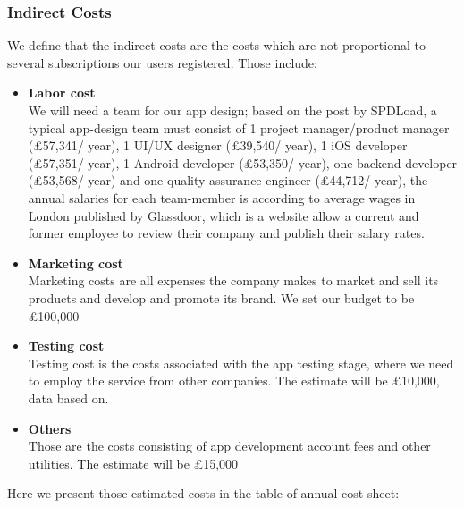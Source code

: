 \subsubsection{Indirect Costs}
We define that the indirect costs are the costs which are not proportional to several subscriptions our users registered. Those include:
\begin{itemize}
\item \textbf{Labor cost}
\\We will need a team for our app design; based on the post by SPDLoad, a typical app-design team must consist of 1 project manager/product manager (£57,341/ year), 1 UI/UX designer (£39,540/ year), 1 iOS developer (£57,351/ year), 1 Android developer (£53,350/ year), one backend developer (£53,568/ year) and one quality assurance engineer (£44,712/ year), the annual salaries for each team-member is according to average wages in London published by Glassdoor, which is a website allow a current and former employee to review their company and publish their salary rates.
\item \textbf{Marketing cost}
\\ Marketing costs are all expenses the company makes to market and sell its products and develop and promote its brand. We set our budget to be £100,000
\item \textbf{Testing cost}
\\ Testing cost is the costs associated with the app testing stage, where we need to employ the service from other companies. The estimate will be £10,000, data based on.
\item \textbf{Others}
\\Those are the costs consisting of app development account fees and other utilities. The estimate will be £15,000
\end{itemize}

Here we present those estimated costs in the table of annual cost sheet:

